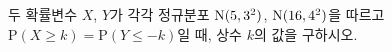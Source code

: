 두 확률변수 $X$, $Y$가 각각 정규분포 $\mathrm{N}(5{,}\mkern3mu\mathopen{}3^2)$, $\mathrm{N}(16{,}\mkern3mu\mathopen{}4^2)$을 따르고 $\mathrm{P}(X\ge k)=\mathrm{P}(Y\le -k)$일 때, 상수 $k$의 값을 구하시오.
